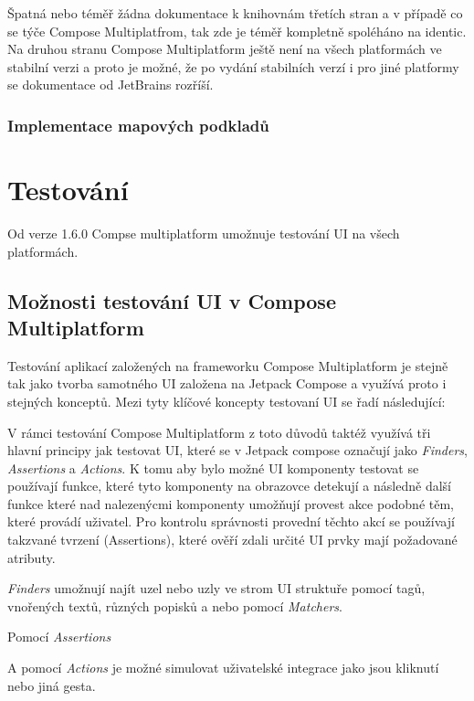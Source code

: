 Špatná nebo téměř žádna dokumentace k knihovnám třetích stran a v případě co se týče Compose Multiplatfrom, tak zde je téměř kompletně spoléháno na
identic. 
Na druhou stranu Compose Multiplatform ještě není na všech platformách ve stabilní verzi a proto je možné, že po vydání stabilních verzí i pro jiné
platformy se dokumentace od JetBrains rozříší.


\subsection{Implementace mapových podkladů}


\chapter{Testování}
Od verze 1.6.0 Compse multiplatform umožnuje testování UI na všech platformách. \cite{composeNews1.6.0}

\section{Možnosti testování UI v Compose Multiplatform}
Testování aplikací založených na frameworku Compose Multiplatform je stejně tak jako tvorba samotného UI založena na Jetpack Compose a využívá 
proto i stejných konceptů. Mezi tyty klíčové koncepty testovaní UI se řadí následující:


V rámci testování
Compose Multiplatform z toto důvodů taktéž využívá tři hlavní principy jak testovat UI, které se v Jetpack compose
označují jako \textit{Finders}, \textit{Assertions} a \textit{Actions}. 
K tomu aby bylo možné UI komponenty testovat se používají funkce, které tyto komponenty na obrazovce detekují a následně další funkce které nad nalezenýcmi 
komponenty umožňují provest akce podobné těm, které provádí uživatel. Pro kontrolu správnosti provední těchto akcí se používají takzvané tvrzení 
(Assertions), které ověří zdali určité UI prvky mají požadované atributy.

\textit{Finders} umožnují najít uzel nebo uzly ve strom UI struktuře pomocí tagů, vnořených textů, různých popisků a nebo pomocí \textit{Matchers}.


Pomocí \textit{Assertions}

A pomocí \textit{Actions} je možné simulovat uživatelské integrace jako jsou kliknutí nebo jiná gesta. \cite{composeTesting}


